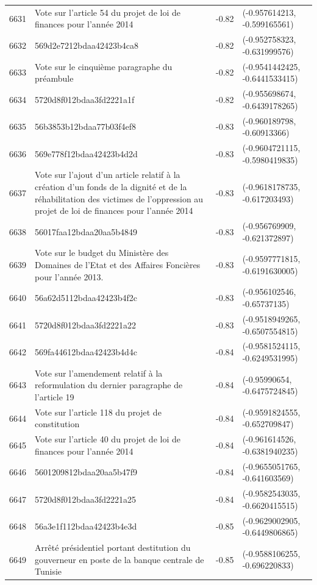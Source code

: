 \begin{table}[ht]
\begin{tabular}{rlrl}
  6631 & Vote sur l'article 54 du projet de loi de finances pour l'année 2014 & -0.82 & (-0.957614213, -0.599165561) \\ 
  6632 & 569d2e7212bdaa42423b4ca8 & -0.82 & (-0.952758323, -0.631999576) \\ 
  6633 & Vote sur le cinquième paragraphe du préambule & -0.82 & (-0.9541442425, -0.6441533415) \\ 
  6634 & 5720d8f012bdaa3fd2221a1f & -0.82 & (-0.955698674, -0.6439178265) \\ 
  6635 & 56b3853b12bdaa77b03f4ef8 & -0.83 & (-0.960189798, -0.60913366) \\ 
  6636 & 569e778f12bdaa42423b4d2d & -0.83 & (-0.9604721115, -0.5980419835) \\ 
  6637 & Vote sur l'ajout d'un article relatif à la création d'un fonds de la dignité et de la réhabilitation des victimes de l'oppression au projet de loi de finances pour l'année 2014 & -0.83 & (-0.9618178735, -0.617203493) \\ 
  6638 & 56017faa12bdaa20aa5b4849 & -0.83 & (-0.956769909, -0.621372897) \\ 
  6639 & Vote sur le budget du Ministère des Domaines de l'Etat et des Affaires Foncières pour l'année 2013. & -0.83 & (-0.9597771815, -0.6191630005) \\ 
  6640 & 56a62d5112bdaa42423b4f2c & -0.83 & (-0.956102546, -0.65737135) \\ 
  6641 & 5720d8f012bdaa3fd2221a22 & -0.83 & (-0.9518949265, -0.6507554815) \\ 
  6642 & 569fa44612bdaa42423b4d4c & -0.84 & (-0.9581524115, -0.6249531995) \\ 
  6643 & Vote sur l'amendement relatif à la reformulation du dernier paragraphe de l'article 19 & -0.84 & (-0.95990654, -0.6475724845) \\ 
  6644 & Vote sur l'article 118 du projet de constitution & -0.84 & (-0.9591824555, -0.652709847) \\ 
  6645 & Vote sur l'article 40 du projet de loi de finances pour l'année 2014 & -0.84 & (-0.961614526, -0.6381940235) \\ 
  6646 & 5601209812bdaa20aa5b47f9 & -0.84 & (-0.9655051765, -0.641603569) \\ 
  6647 & 5720d8f012bdaa3fd2221a25 & -0.84 & (-0.9582543035, -0.6620415515) \\ 
  6648 & 56a3e1f112bdaa42423b4e3d & -0.85 & (-0.9629002905, -0.6449806865) \\ 
  6649 & Arrêté présidentiel portant destitution du gouverneur en poste de la banque centrale de Tunisie & -0.85 & (-0.9588106255, -0.696220833) \\ 

\end{tabular}
\end{table}
